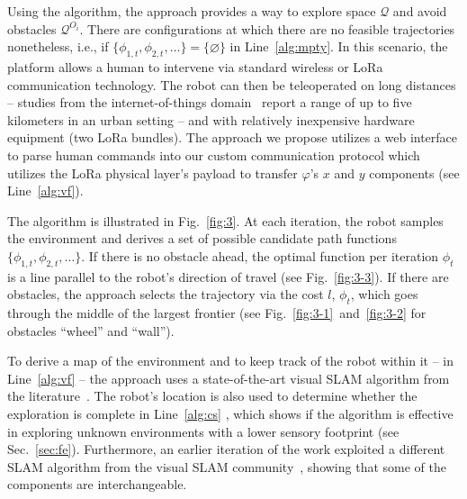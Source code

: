 \documentclass[letterpaper,10pt,conference,twoside]{IEEEtran}
\theoremstyle{definition}
\begin{document}
Using the algorithm, the %
approach provides a way to explore space $\mathcal{Q}$ and avoid obstacles $\mathcal{Q}^{O_i}$. There are configurations at which there are no feasible trajectories nonetheless, i.e., if $\{\phi_{1,t},\phi_{2,t},\dots\}=\{\varnothing\}$ in Line~\ref{alg:mpty}. In this scenario, the %
platform allows a human to intervene via standard wireless or LoRa communication technology. The robot can then be teleoperated on long distances -- studies from the internet-of-things domain~\cite{shanmuga2020survey%
} report a range of up to five kilometers in an urban setting -- and with relatively inexpensive hardware equipment (two LoRa bundles). The %
approach we propose utilizes a web interface to parse human commands into our custom communication protocol which utilizes the LoRa physical layer's payload to transfer $\varphi$'s $x$ and $y$ components (see Line~\ref{alg:vf}).

The algorithm is illustrated in Fig.~\ref{fig:3}. At each iteration, the robot samples the environment and derives a set of possible candidate path functions $\{\phi_{1,t},\phi_{2,t},\dots\}$. If there is no obstacle ahead, the optimal function per iteration $\phi_t$ is a line parallel to the robot's direction of travel (see Fig.~\ref{fig:3-3}). If there are obstacles, the %
approach selects the trajectory via the cost $l$, $\phi_t$, which goes through the middle of the largest frontier (see Fig.~\ref{fig:3-1}~and~\ref{fig:3-2} for %
obstacles ``wheel'' and ``wall'').

To derive a map of the environment and to keep %
track of the robot within it -- in Line~\ref{alg:vf} -- the %
approach uses a state-of-the-art visual SLAM algorithm from the literature~\cite{labbe2019rtab}. The robot's location is also used to determine whether the exploration is complete in Line~\ref{alg:cs}%
, %
which shows if the algorithm is effective in exploring unknown environments with a lower sensory footprint (see Sec.~\ref{sec:fe}). Furthermore, an earlier iteration of the work exploited a different SLAM algorithm from the visual SLAM community~\cite{campos2021orb}, showing that some of the %
components are interchangeable.
\end{document}
